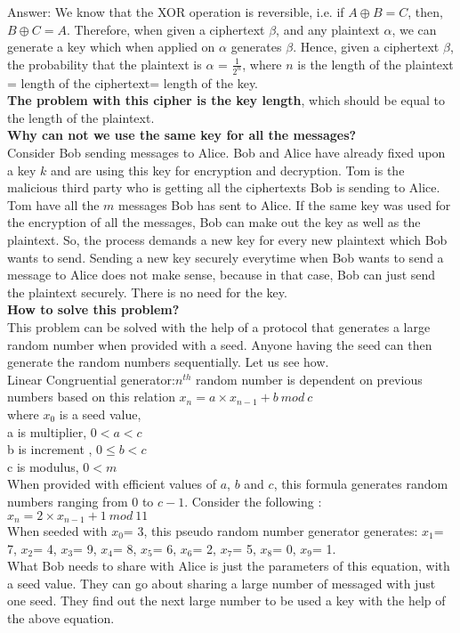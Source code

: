 \documentclass{llncs}
\begin{document}
Answer: We know that the XOR operation is reversible, i.e. if $A \oplus B = C$, then, $B \oplus C = A$. Therefore, when given a ciphertext $\beta$, and any plaintext $\alpha$, we can generate a key which when applied on $\alpha$ generates $\beta$. Hence, given a ciphertext $\beta$, the probability that the plaintext is $\alpha$ = $\frac{1}{2^n}$, where $n$ is the length of the plaintext = length of the ciphertext= length of the key.  
\\

\textbf{The problem with this cipher is the key length}, which should be equal to the length of the plaintext. \\
\textbf{Why can not we use the same key for all the messages?}\\
Consider Bob sending messages to Alice. Bob and Alice have already fixed upon a key $k$ and are using this key for encryption and decryption. Tom is the malicious third party who is getting all the ciphertexts Bob is sending to Alice. Tom have all the $m$ messages Bob has sent to Alice. If the same key was used for the encryption of all the messages, Bob can make out the key as well as the plaintext. So, the process demands a new key for every new plaintext which Bob wants to send. Sending a new key securely everytime when Bob wants to send a message to Alice does not make sense, because in that case, Bob can just send the plaintext securely. There is no need for the key. \\

\textbf{How to solve this problem? }\\
This problem can be solved with the help of a protocol that generates a large random number when provided with a seed. Anyone having the seed can then generate the random numbers sequentially. Let us see how.\\ 

Linear Congruential generator:$n^{th}$ random number is dependent on previous numbers based on this relation ${x_n}=a\times x_{n-1} + b\ mod\ c  $\\
where ${x_0}$ is a seed value,\\
a is multiplier, $0<a<c$\\
b is increment , $0 \leq b < c$\\
c is modulus, $ 0<m $\\

When provided with efficient values of $a$, $b$ and $c$, this formula generates random numbers ranging from $0$ to $c-1$. Consider the following : \\
 ${x_n}=2 \times x_{n-1} + 1\ mod\ 11  $\\
 
 When seeded with $x_0$= 3, this pseudo random number generator generates: $x_1$= 7, $x_2$= 4, $x_3$= 9, $x_4$= 8, $x_5$= 6, $x_6$= 2, $x_7$= 5, $x_8$= 0, $x_9$= 1. \\
 
 What Bob needs to share with Alice is just the parameters of this equation, with a seed value. They can go about sharing a large number of messaged with just one seed. They find out the next large number to be used a key with the help of the above equation. 
\end{document}
